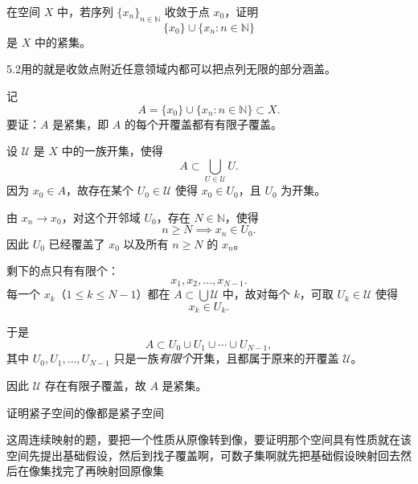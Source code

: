 \begin{homework}[5.2]
在空间 $X$ 中，若序列 $\{x_n\}_{n\in\mathbb{N}}$ 收敛于点 $x_0$，证明
\[
\{x_0\}\cup\{x_n : n\in\mathbb{N}\}
\]
是 $X$ 中的紧集。
\end{homework}
\begin{dxtips}
    5.2用的就是收敛点附近任意领域内都可以把点列无限的部分涵盖。
\end{dxtips}
\begin{solution}
记
\[
A=\{x_0\}\cup\{x_n : n\in\mathbb{N}\}\subset X.
\]
要证：$A$ 是紧集，即 $A$ 的每个开覆盖都有有限子覆盖。

设 $\mathcal{U}$ 是 $X$ 中的一族开集，使得
\[
A \subset \bigcup_{U\in\mathcal{U}} U.
\]
因为 $x_0\in A$，故存在某个 $U_0\in\mathcal{U}$ 使得 $x_0\in U_0$，且 $U_0$ 为开集。

由 $x_n\to x_0$，对这个开邻域 $U_0$，存在 $N\in\mathbb{N}$，使得
\[
n\ge N \implies x_n\in U_0.
\]
因此 $U_0$ 已经覆盖了 $x_0$ 以及所有 $n\ge N$ 的 $x_n$。

剩下的点只有有限个：
\[
x_1,x_2,\dots,x_{N-1}.
\]
每一个 $x_k$（$1\le k\le N-1$）都在 $A\subset\bigcup\mathcal{U}$ 中，故对每个 $k$，可取 $U_k\in\mathcal{U}$ 使得
\[
x_k\in U_k.
\]

于是
\[
A \subset U_0 \cup U_1 \cup \cdots \cup U_{N-1},
\]
其中 $U_0,U_1,\dots,U_{N-1}$ 只是一族\emph{有限个}开集，且都属于原来的开覆盖 $\mathcal{U}$。

因此 $\mathcal{U}$ 存在有限子覆盖，故 $A$ 是紧集。
\end{solution}
\begin{homework}[2]
    证明紧子空间的像都是紧子空间
\end{homework}
\begin{dxtips}
    这周连续映射的题，要把一个性质从原像转到像，要证明那个空间具有性质就在该空间先提出基础假设，然后到找子覆盖啊，可数子集啊就先把基础假设映射回去然后在像集找完了再映射回原像集
\end{dxtips}
